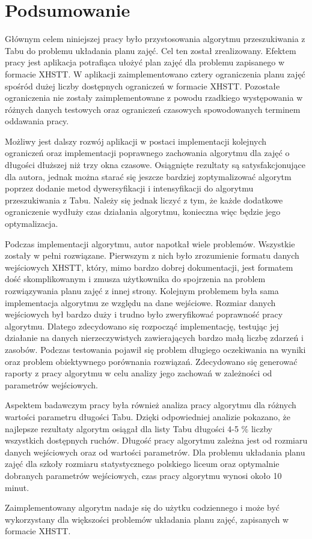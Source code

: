 \chapter{Podsumowanie}

Głównym celem niniejszej pracy było przystosowania algorytmu przeszukiwania z Tabu do problemu układania planu zajęć. Cel ten został zrealizowany. Efektem pracy jest aplikacja potrafiąca ułożyć plan zajęć dla problemu zapisanego w formacie XHSTT. W aplikacji zaimplementowano cztery ograniczenia planu zajęć spośród dużej liczby dostępnych ograniczeń w formacie XHSTT. Pozostałe ograniczenia nie zostały zaimplementowane z powodu rzadkiego występowania w różnych danych testowych oraz ograniczeń czasowych spowodowanych terminem oddawania pracy. 

Możliwy jest dalszy rozwój aplikacji w postaci implementacji kolejnych ograniczeń oraz implementacji poprawnego zachowania algorytmu dla zajęć o długości dłuższej niż trzy okna czasowe. Osiągnięte rezultaty są satysfakcjonujące dla autora, jednak można starać się jeszcze bardziej zoptymalizować algorytm poprzez dodanie metod dywersyfikacji i intensyfikacji do algorytmu przeszukiwania z Tabu. Należy się jednak liczyć z tym, że każde dodatkowe ograniczenie wydłuży czas działania algorytmu, konieczna więc będzie jego optymalizacja.

Podczas implementacji algorytmu, autor napotkał wiele problemów. Wszystkie zostały w pełni rozwiązane. Pierwszym z nich było zrozumienie formatu danych wejściowych XHSTT, który, mimo bardzo dobrej dokumentacji, jest formatem dość skomplikowanym i zmusza użytkownika do spojrzenia na problem rozwiązywania planu zajęć z innej strony. Kolejnym problemem była sama implementacja algorytmu ze względu na dane wejściowe. Rozmiar danych wejściowych był bardzo duży i trudno było zweryfikować poprawność pracy algorytmu. Dlatego zdecydowano się rozpocząć implementację, testując jej działanie na danych nierzeczywistych zawierających bardzo małą liczbę zdarzeń i zasobów. Podczas testowania pojawił się problem długiego oczekiwania na wyniki oraz problem obiektywnego porównania rozwiązań. Zdecydowano się generować raporty z pracy algorytmu w celu analizy jego zachowań w zależności od parametrów wejściowych.

Aspektem badawczym pracy była również analiza pracy algorytmu dla różnych wartości parametru długości Tabu. Dzięki odpowiedniej analizie pokazano, że najlepsze rezultaty algorytm osiągał dla listy Tabu długości 4-5 \% liczby wszystkich dostępnych ruchów. Długość pracy algorytmu zależna jest od rozmiaru danych wejściowych oraz od wartości parametrów. Dla problemu układania planu zajęć dla szkoły rozmiaru statystycznego polskiego liceum oraz optymalnie dobranych parametrów wejściowych, czas pracy algorytmu wynosi około 10 minut.

Zaimplementowany algorytm nadaje się do użytku codziennego i może być wykorzystany dla większości problemów układania planu zajęć, zapisanych w formacie XHSTT.


